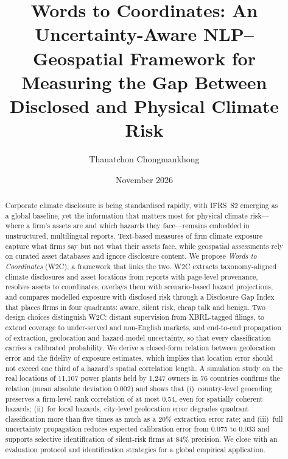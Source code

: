 \documentclass{article}
\title{Words to Coordinates: An Uncertainty-Aware NLP--Geospatial Framework for Measuring the Gap Between Disclosed and Physical Climate Risk}
\author{Thanatchon Chongmankhong}
\date{November 2026}
\theoremstyle{plain}
\theoremstyle{definition}
\begin{document}
\maketitle

\begin{abstract}
Corporate climate disclosure is being standardised rapidly, with IFRS~S2 emerging as a global baseline, yet the information that matters most for physical climate risk---where a firm's assets are and which hazards they face---remains embedded in unstructured, multilingual reports. Text-based measures of firm climate exposure capture what firms say but not what their assets face, while geospatial assessments rely on curated asset databases and ignore disclosure content. We propose \emph{Words to Coordinates} (W2C), a framework that links the two. W2C extracts taxonomy-aligned climate disclosures and asset locations from reports with page-level provenance, resolves assets to coordinates, overlays them with scenario-based hazard projections, and compares modelled exposure with disclosed risk through a Disclosure Gap Index that places firms in four quadrants: aware, silent risk, cheap talk and benign. Two design choices distinguish W2C: distant supervision from XBRL-tagged filings, to extend coverage to under-served and non-English markets, and end-to-end propagation of extraction, geolocation and hazard-model uncertainty, so that every classification carries a calibrated probability. We derive a closed-form relation between geolocation error and the fidelity of exposure estimates, which implies that location error should not exceed one third of a hazard's spatial correlation length. A simulation study on the real locations of 11,107 power plants held by 1,247 owners in 76 countries confirms the relation (mean absolute deviation 0.002) and shows that (i)~country-level geocoding preserves a firm-level rank correlation of at most 0.54, even for spatially coherent hazards; (ii)~for local hazards, city-level geolocation error degrades quadrant classification more than five times as much as a 20\% extraction error rate; and (iii)~full uncertainty propagation reduces expected calibration error from 0.075 to 0.033 and supports selective identification of silent-risk firms at 84\% precision. We close with an evaluation protocol and identification strategies for a global empirical application.
\end{abstract}

\end{document}
